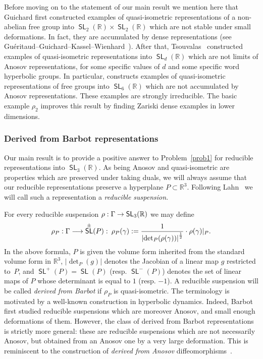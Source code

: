 \documentclass[AHL,Unicode,longabstracts]{cedram}
\DeclareMathOperator{\SL}{\mathsf{SL}}
\newcommand{\R}{\mathbb{R}}
\renewcommand*{\to}{\mathchoice{\longrightarrow}{\rightarrow}{\rightarrow}{\rightarrow}}
\let\originalleft\left
\let\originalright\right
\renewcommand{\left}{\mathopen{}\mathclose\bgroup\originalleft}
\renewcommand{\right}{\aftergroup\egroup\originalright}
\begin{document}
Before moving on to the statement of our main result we mention here that Guichard first constructed examples of quasi-isometric representations of a non-abelian free group into $\SL_2(\R)\times\SL_2(\R)$ which are not stable under small deformations. In fact, they are accumulated by dense representations (see Guéritaud--Guichard--Kassel--Wienhard~\cite[Appendix~A]{GGKW}). After that, Tsouvalas~\cite{tsouvalas} constructed examples of quasi-isometric representations into $\SL_d(\R)$ which are not limits of Anosov representations, for some specific values of $d$ and some specific word hyperbolic groups. In particular, \cite[Proposition~4.2]{tsouvalas} constructs examples of quasi-isometric representations of free groups into $\SL_6(\R)$ which are not accumulated by Anosov representations. These examples are strongly irreducible. The basic example $\rho_2$ improves this result by finding Zariski dense examples in lower dimensions.



\subsubsection{Derived from Barbot representations}\label{sss derived barbot intro}


Our main result is to provide a positive answer to Problem~\ref{prob1} for reducible representations into $\SL_3(\R)$. As being Anosov and quasi-isometric are properties which are preserved under taking duals, we will always assume that our reducible representations preserve a hyperplane $P\subset\R^3$. Following Lahn~\cite{lahn} we will call such a representation a \emph{reducible suspension}.

For every reducible suspension $\rho:\Gamma\to\SL_3(\R)$ we may define
\[
\rho_P:\Gamma \to \SL^{\pm}(P): \: \rho_P(\gamma):= \frac{1}{\left|\det_P(\rho(\gamma))\right|^{\frac{1}{2}}}\cdot\rho(\gamma)\vert_{P}.
\]
In the above formula, $P$ is given the volume form inherited from the standard volume form in $\R^3$, $|\det_P(g)|$ denotes the Jacobian of a linear map $g$ restricted to~$P$, and $\SL^+(P)=\SL(P)$ (resp. $\SL^-(P)$) denotes the set of linear maps of $P$ whose determinant is equal to $1$ (resp. $-1$). A reducible suspension will be called \emph{derived from Barbot} if $\rho_P$ is quasi-isometric. The terminology is motivated by a well-known construction in hyperbolic dynamics. Indeed, Barbot~\cite{barbot} first studied reducible suspensions which are moreover Anosov, and small enough deformations of them. However, the class of derived from Barbot representations is strictly more general: these are reducible suspensions which are not necessarily Anosov, but obtained from an Anosov one by a very large deformation. This is reminiscent to the construction of \emph{derived from Anosov} diffeomorphisms~\cite{mane}.
\end{document}
